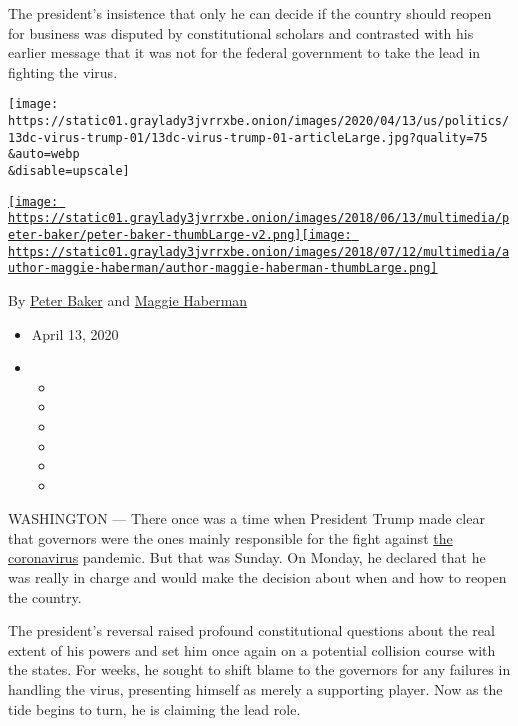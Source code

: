 The president's insistence that only he can decide if the country should
reopen for business was disputed by constitutional scholars and
contrasted with his earlier message that it was not for the federal
government to take the lead in fighting the virus.

\texttt{[image: https://static01.graylady3jvrrxbe.onion/images/2020/04/13/us/politics/13dc-virus-trump-01/13dc-virus-trump-01-articleLarge.jpg?quality=75\\\&auto=webp\\\&disable=upscale]}

\href{https://www.nytimes3xbfgragh.onion/by/peter-baker}{\texttt{[image: https://static01.graylady3jvrrxbe.onion/images/2018/06/13/multimedia/peter-baker/peter-baker-thumbLarge-v2.png]}}\href{https://www.nytimes3xbfgragh.onion/by/maggie-haberman}{\texttt{[image: https://static01.graylady3jvrrxbe.onion/images/2018/07/12/multimedia/author-maggie-haberman/author-maggie-haberman-thumbLarge.png]}}

By \href{https://www.nytimes3xbfgragh.onion/by/peter-baker}{Peter Baker}
and \href{https://www.nytimes3xbfgragh.onion/by/maggie-haberman}{Maggie
Haberman}

\begin{itemize}
\item
  April 13, 2020
\item
  \begin{itemize}
  \item
  \item
  \item
  \item
  \item
  \item
  \end{itemize}
\end{itemize}

WASHINGTON --- There once was a time when President Trump made clear
that governors were the ones mainly responsible for the fight against
\href{https://www.nytimes3xbfgragh.onion/news-event/coronavirus}{the
coronavirus} pandemic. But that was Sunday. On Monday, he declared that
he was really in charge and would make the decision about when and how
to reopen the country.

The president's reversal raised profound constitutional questions about
the real extent of his powers and set him once again on a potential
collision course with the states. For weeks, he sought to shift blame to
the governors for any failures in handling the virus, presenting himself
as merely a supporting player. Now as the tide begins to turn, he is
claiming the lead role.

